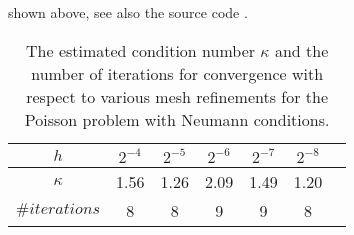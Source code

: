 shown above, see also the source code . 
\begin{table}
\begin{center}
\begin{tabular}{|c||c|c|c|c|c|c|}
\hline
$h$ & $2^{-4}$ & $2^{-5}$ & $2^{-6}$ & $2^{-7}$ & $2^{-8}$ \\ \hline 
$\kappa$ & 1.56 & 1.26 & 2.09 & 1.49 & 1.20 \\ \hline
$\#iterations$ & 8 & 8 & 9 & 9 & 8 \\ \hline 
\end{tabular}
\caption{The estimated condition number $\kappa$ and the number of iterations for 
  convergence with respect to various mesh refinements for the Poisson problem with Neumann conditions.}\label{tabel:neumann} 
\end{center}
\end{table}



